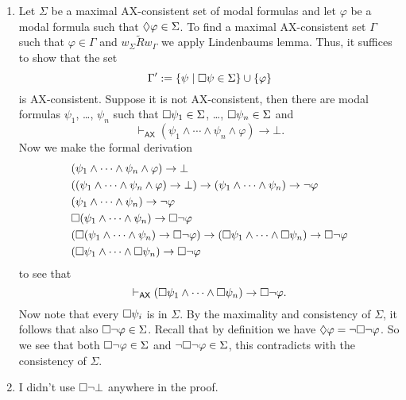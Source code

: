 \documentclass{article}
\begin{document}
\begin{ex}
\begin{enumerate}
\item Let $\Sigma$ be a maximal \textsf{AX}-consistent set of modal formulas and let
$\varphi$ be a modal formula such that $\lozenge\varphi\in\Sigma$. To find a
maximal \textsf{AX}-consistent set $\Gamma$ such that $\varphi\in\Gamma$ and
$w_\Sigma\mathbin{\tilde{R}}w_\Gamma$ we apply Lindenbaums lemma. Thus, it
suffices to show that the set
\begin{equation*}
\Gamma':=\{\psi\mid\square\psi\in\Sigma\}\cup\{\varphi\}
\end{equation*}
is \textsf{AX}-consistent. Suppose it is not \textsf{AX}-consistent, then there
are modal formulas $\psi_1$, \ldots, $\psi_n$ such that $\square\psi_1\in\Sigma$, 
\ldots, $\square\psi_n\in\Sigma$ and
\begin{equation*}
\vdash_{\textsf{AX}} (\psi_1\land\cdots\land\psi_n\land\varphi)\to\bot.
\end{equation*}
Now we make the formal derivation
\begin{align*}
& (\psi_1\land\cdots\land\psi_n\land\varphi)\to\bot
  \\
& ((\psi_1\land\cdots\land\psi_n\land\varphi)\to\bot)
  \to (\psi_1\land\cdots\land\psi_n)\to\neg\varphi
  \\
& (\psi_1\land\cdots\land\psi_n)\to\neg\varphi
  \\
& \square(\psi_1\land\cdots\land\psi_n)\to\square\neg\varphi
  \\
& (\square(\psi_1\land\cdots\land\psi_n)\to\square\neg\varphi)
  \to
  (\square\psi_1\land\cdots\land\square\psi_n)\to\square\neg\varphi
  \\
& (\square\psi_1\land\cdots\land\square\psi_n)\to\square\neg\varphi
\end{align*}
to see that
\begin{equation*}
\vdash_{\textsf{AX}} (\square\psi_1\land\cdots\land\square\psi_n)\to\square\neg\varphi.
\end{equation*}
Now note that every $\square\psi_i$ is in $\Sigma$. By the maximality and
consistency of $\Sigma$, it follows that also $\square\neg\varphi\in\Sigma$. Recall
that by definition we have $\lozenge\varphi=\neg\square\neg\varphi$. So we see
that both $\square\neg\varphi\in\Sigma$ and $\neg\square\neg\varphi\in\Sigma$, this
contradicts with the consistency of $\Sigma$. 
\item I didn't use $\square\neg\bot$ anywhere in the proof.
\end{enumerate}
\end{ex}
\end{document}
